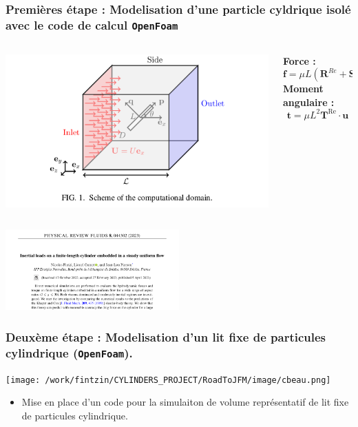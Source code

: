 \documentclass{sintefbeamer}
\begin{document}
\begin{frame}
  \frametitle{Premi\`eres \'etape : Modelisation d'une particle cyldrique isol\'e avec le code de calcul \texttt{OpenFoam} }
  
  \begin{columns}
    \begin{column}{0.5\textwidth}
  \includegraphics[width=\textwidth]{image/cylindre_trans.png}

      
    \end{column}
    \begin{column}{0.5\textwidth}
      \textbf{Force : }
      \begin{equation*}
        \textbf{f} = 
        \mu L (\textbf{R}^{Re}+ \mathbf{S}^{Re})\cdot\textbf{u}
      \end{equation*}
      \textbf{Moment angulaire : }
      \begin{equation*}
        \textbf{t} = 
        \mu L^2 \textbf{T}^\text{Re}\cdot \textbf{u}
      \end{equation*}
    \end{column}
  \end{columns}
\pause 
\centering
\includegraphics[width=0.5\textwidth]{image/paper.png}

\end{frame}
\begin{frame}
  \frametitle{Deux\`eme \'etape : Modelisation d'un lit fixe de particules cylindrique (\texttt{OpenFoam}).}

  \centering
\texttt{[image: /work/fintzin/CYLINDERS\_PROJECT/RoadToJFM/image/cbeau.png]}

\begin{itemize}
  \item Mise en place d'un code pour la simulaiton de volume représentatif de lit fixe de particules cylindrique. 
\end{itemize}
\end{frame}
\end{document}
